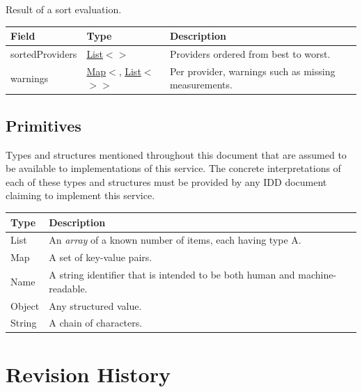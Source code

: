 \documentclass[a4paper]{arrowhead}
\newcommand{\pdef}[1]{{\textcolor{ArrowheadGrey}{#1\label{sec:model:primitives:#1}\label{sec:model:primitives:#1s}\label{sec:model:primitives:#1es}}}}
\newcommand{\pref}[1]{{\textcolor{ArrowheadGrey}{\hyperref[sec:model:primitives:#1]{#1}}}}
\begin{document}

Result of a sort evaluation.


\noindent\begin{tabularx}{\textwidth}{| >{\raggedright\arraybackslash}p{3.9cm} | >{\raggedright\arraybackslash\small}p{5.3cm} | X |} \hline
\rowcolor{gray!33} Field & Type & Description \\ \hline
sorted\allowbreak{}Providers & \pref{List}$<$\allowbreak{}\pref{String}$>$ & Providers ordered from best to worst. \\ \hline
warnings & \pref{Map}$<$\allowbreak{}\pref{String}, \pref{List}$<$\allowbreak{}\pref{String}$>$$>$ & Per provider, warnings such as missing measurements. \\ \hline
\end{tabularx}



\subsection{Primitives}
\label{sec:model:primitives}

Types and structures mentioned throughout this document that are assumed to be available to implementations of this service.
The concrete interpretations of each of these types and structures must be provided by any IDD document claiming to implement this service.

\noindent\begin{tabularx}{\textwidth}{| p{4.6cm} | X |} \hline
\rowcolor{gray!33} Type & Description \\ \hline
\pdef{List} & An \textit{array} of a known number of items, each having type A. \\ \hline
\pdef{Map} & A set of key-value pairs. \\ \hline
\pdef{Name} & A string identifier that is intended to be both human and machine-readable. \\ \hline
\pdef{Object} & Any structured value. \\ \hline
\pdef{String} & A chain of characters. \\ \hline
\end{tabularx}

\newpage




\newpage

\section{Revision History}
\end{document}
